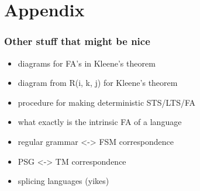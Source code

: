 \documentclass{beamer}
\begin{document}
\section{Appendix}
\begin{frame}
\frametitle{Other stuff that might be nice}
\begin{itemize}
\item diagrams for FA's in Kleene's theorem
\item diagram from R(i, k, j) for Kleene's theorem
\item procedure for making deterministic STS/LTS/FA
\item what exactly is the intrinsic FA of a language
\item regular grammar <-> FSM correspondence
\item PSG <-> TM correspondence
\item splicing languages (yikes) 
\end{itemize}
\end{frame}
\end{document}
